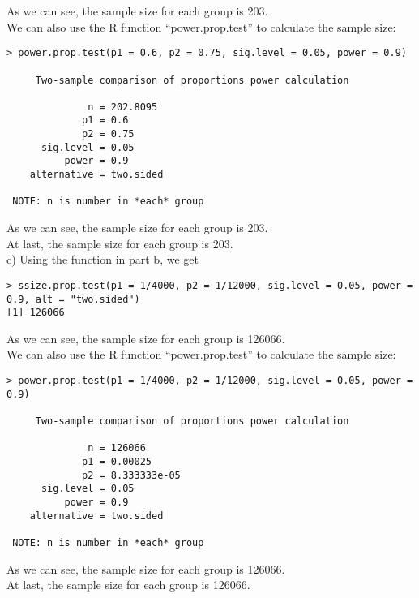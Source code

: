 \documentclass[12pt]{article}
\begin{document}
As we can see, the sample size for each group is 203. \\

We can also use the R function ``power.prop.test'' to calculate the
sample size:

\begin{verbatim}
> power.prop.test(p1 = 0.6, p2 = 0.75, sig.level = 0.05, power = 0.9)

     Two-sample comparison of proportions power calculation 

              n = 202.8095
             p1 = 0.6
             p2 = 0.75
      sig.level = 0.05
          power = 0.9
    alternative = two.sided

 NOTE: n is number in *each* group 
\end{verbatim}

As we can see, the sample size for each group is 203. \\

At last, the sample size for each group is 203. \\

c) Using the function in part b, we get

\begin{verbatim}
> ssize.prop.test(p1 = 1/4000, p2 = 1/12000, sig.level = 0.05, power =
0.9, alt = "two.sided")
[1] 126066
\end{verbatim}

As we can see, the sample size for each group is 126066. \\

We can also use the R function ``power.prop.test'' to calculate the
sample size:

\begin{verbatim}
> power.prop.test(p1 = 1/4000, p2 = 1/12000, sig.level = 0.05, power =
0.9)

     Two-sample comparison of proportions power calculation 

              n = 126066
             p1 = 0.00025
             p2 = 8.333333e-05
      sig.level = 0.05
          power = 0.9
    alternative = two.sided

 NOTE: n is number in *each* group 
\end{verbatim}

As we can see, the sample size for each group is 126066. \\

At last, the sample size for each group is 126066.
\end{document}
